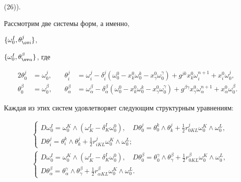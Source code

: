 (26)). 


 


Рассмотрим две системы форм, а именно, 


$\{\omega^I_0,\theta^j_{\ov i}\}$, 


$\{\omega^I_0,\theta^\beta_{\ov\alpha}\}$, где 


\begin{alignat}{2} 


\theta^j_0&=\omega^j_0,&\quad \theta^j_i&=\omega^j_i- 


\delta^j_i(\omega^0_0-x^0_k\omega^k_0-x^0_\gamma\omega^\gamma_0)+ 


g^{j k}x^0_k\omega^{n+1}_i+x^0_i\omega^j_0, \\ 


% 


\theta^\beta_0&=\omega^\beta_0,&\quad \theta^\beta_\alpha&= 


\omega^\beta_\alpha-\delta^\beta_\alpha(\omega^0_0- 


x^0_k\omega^k_0-x^0_\gamma\omega^\gamma_0)+g^{\beta\gamma} 


x^0_\gamma\omega^{n+1}_\alpha+x^0_\alpha\omega^\beta_0. 


\end{alignat} 


Каждая из этих систем удовлетворяет следующим структурным уравнениям: 


\begin{align} 


& 


\begin{cases} 


D\omega^I_0=\omega^K_0\wedge(\omega^I_K-\delta^I_K\omega^0_0), 


\quad D\theta^j_0=\theta^k_0\wedge\theta^j_k+\frac{1}{2} 


r^j_{0K L}\omega^K_0\wedge\omega^L_0, \\ 


D\theta^j_i=\theta^k_i\wedge\theta^j_k+\frac{1}{2} 


r^j_{i K L}\omega^K_0\wedge\omega^L_0; 


\end{cases} 


\\ 


&


\begin{cases} 


D\omega^I_0=\omega^K_0\wedge(\omega^I_K-\delta^I_K\omega^0_0), 


\quad D\theta^\beta_0=\theta^\gamma_0\wedge\theta^\beta_\gamma+ 


\frac{1}{2}r^\beta_{0K L}\omega^K_0\wedge\omega^L_0, \\ 


D\theta^\beta_\alpha=\theta^\gamma_\alpha\wedge\theta^\beta_\gamma+ 


\frac{1}{2}r^\beta_{\alpha K L}\omega^K_0\wedge\omega^L_0. 


\end{cases} 


\end{align} 


